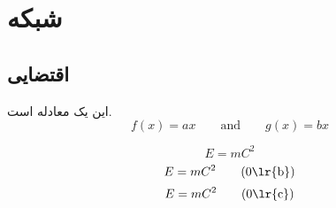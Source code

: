 \documentclass{article}
\begin{document}
\section{شبکه} \subsection{اقتضایی}
این یک معادله است. 
\begin{equation}
  f(x)=ax \qquad \text{and} \qquad g(x)=bx 
\end{equation}

\begin{equation}
E = mC^2 
\end{equation}
\begin{equation}
E = mC^2 
\tag{\theequation\lr{b}}
\end{equation}
\begin{equation}
E = mC^2 
\tag{\theequation\lr{c}}
\end{equation}
\end{document}

